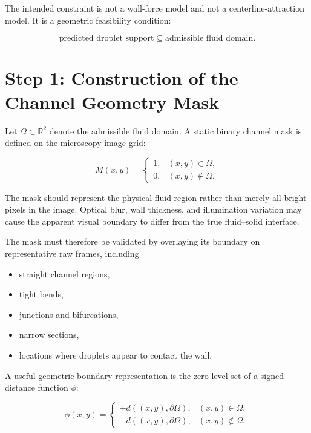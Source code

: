 \documentclass[11pt]{article}
\begin{document}
The intended constraint is not a wall-force model and not a centerline-attraction model. It is a geometric feasibility condition:

\begin{equation}
    \text{predicted droplet support}
    \subseteq
    \text{admissible fluid domain}.
\end{equation}

\section{Step 1: Construction of the Channel Geometry Mask}

Let $\Omega \subset \mathbb{R}^{2}$ denote the admissible fluid domain. A static binary channel mask is defined on the microscopy image grid:

\begin{equation}
    M(x,y)
    =
    \begin{cases}
        1, & (x,y)\in\Omega,\\
        0, & (x,y)\notin\Omega.
    \end{cases}
\end{equation}

The mask should represent the physical fluid region rather than merely all bright pixels in the image. Optical blur, wall thickness, and illumination variation may cause the apparent visual boundary to differ from the true fluid--solid interface.

The mask must therefore be validated by overlaying its boundary on representative raw frames, including

\begin{itemize}[leftmargin=1.5em]
    \item straight channel regions,
    \item tight bends,
    \item junctions and bifurcations,
    \item narrow sections,
    \item locations where droplets appear to contact the wall.
\end{itemize}

A useful geometric boundary representation is the zero level set of a signed distance function $\phi$:

\begin{equation}
    \phi(x,y)
    =
    \begin{cases}
        +d\!\left((x,y),\partial\Omega\right), & (x,y)\in\Omega,\\
        -d\!\left((x,y),\partial\Omega\right), & (x,y)\notin\Omega,
    \end{cases}
\end{equation}
\end{document}
